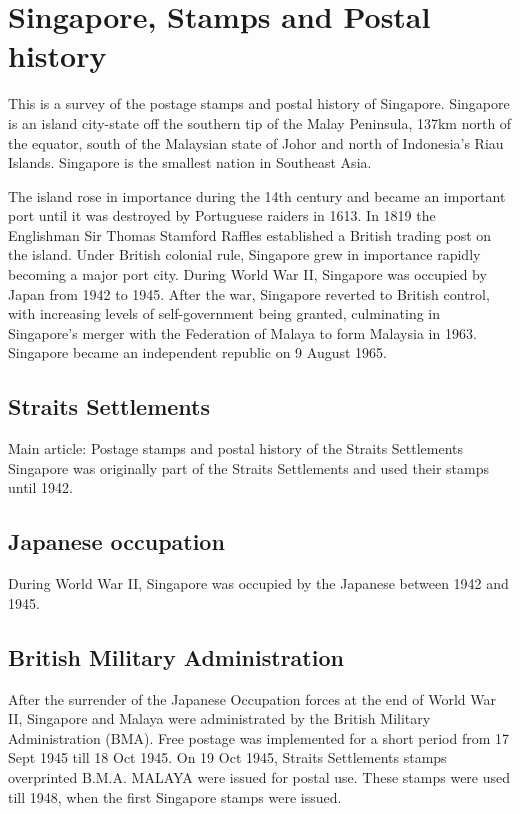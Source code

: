 \section{Singapore, Stamps and Postal history}

This is a survey of the postage stamps and postal history of Singapore.
Singapore is an island city-state off the southern tip of the Malay Peninsula, 137km north of the equator, south of the Malaysian state of Johor and north of Indonesia's Riau Islands. Singapore is the smallest nation in Southeast Asia.

The island rose in importance during the 14th century and became an important port until it was destroyed by Portuguese raiders in 1613. In 1819 the Englishman Sir Thomas Stamford Raffles established a British trading post on the island. Under British colonial rule, Singapore grew in importance rapidly becoming a major port city. During World War II, Singapore was occupied by Japan from 1942 to 1945. After the war, Singapore reverted to British control, with increasing levels of self-government being granted, culminating in Singapore's merger with the Federation of Malaya to form Malaysia in 1963. Singapore became an independent republic on 9 August 1965.


\subsection{Straits Settlements}

Main article: Postage stamps and postal history of the Straits Settlements
Singapore was originally part of the Straits Settlements and used their stamps until 1942.


\subsection{Japanese occupation}

During World War II, Singapore was occupied by the Japanese between 1942 and 1945.


\subsection{British Military Administration}

After the surrender of the Japanese Occupation forces at the end of World War II, Singapore and Malaya were administrated by the British Military Administration (BMA). Free postage was implemented for a short period from 17 Sept 1945 till 18 Oct 1945. On 19 Oct 1945, Straits Settlements stamps overprinted B.M.A. MALAYA were issued for postal use. These stamps were used till 1948, when the first Singapore stamps were issued.


